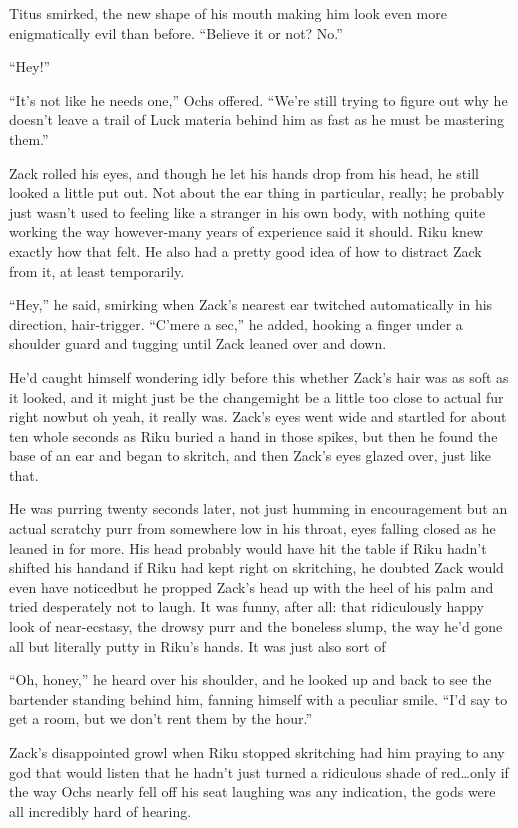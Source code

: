 Titus smirked, the new shape of his mouth making him look even more enigmatically evil than before. ``Believe it or not? No.''

``Hey!''

``It's not like he needs one,'' Ochs offered. ``We're still trying to figure out why he doesn't leave a trail of Luck materia behind him as fast as he must be mastering them.''

Zack rolled his eyes, and though he let his hands drop from his head, he still looked a little put out. Not about the ear thing in particular, really; he probably just wasn't used to feeling like a stranger in his own body, with nothing quite working the way however-many years of experience said it should. Riku knew exactly how that felt. He also had a pretty good idea of how to distract Zack from it, at least temporarily.

``Hey,'' he said, smirking when Zack's nearest ear twitched automatically in his direction, hair-trigger. ``C'mere a sec,'' he added, hooking a finger under a shoulder guard and tugging until Zack leaned over and down.

He'd caught himself wondering idly before this whether Zack's hair was as soft as it looked, and it might just be the change\textemdash might be a little too close to actual fur right now\textemdash but oh yeah, it really was. Zack's eyes went wide and startled for about ten whole seconds as Riku buried a hand in those spikes, but then he found the base of an ear and began to skritch, and then Zack's eyes glazed over, just like that.

He was purring twenty seconds later, not just humming in encouragement but an actual scratchy purr from somewhere low in his throat, eyes falling closed as he leaned in for more. His head probably would have hit the table if Riku hadn't shifted his hand\textemdash and if Riku had kept right on skritching, he doubted Zack would even have noticed\textemdash but he propped Zack's head up with the heel of his palm and tried desperately not to laugh. It was funny, after all: that ridiculously happy look of near-ecstasy, the drowsy purr and the boneless slump, the way he'd gone all but literally putty in Riku's hands. It was just also sort of\textemdash 

``Oh, honey,'' he heard over his shoulder, and he looked up and back to see the bartender standing behind him, fanning himself with a peculiar smile. ``I'd say to get a room, but we don't rent them by the hour.''

Zack's disappointed growl when Riku stopped skritching had him praying to any god that would listen that he hadn't just turned a ridiculous shade of red\ldots only if the way Ochs nearly fell off his seat laughing was any indication, the gods were all incredibly hard of hearing.

